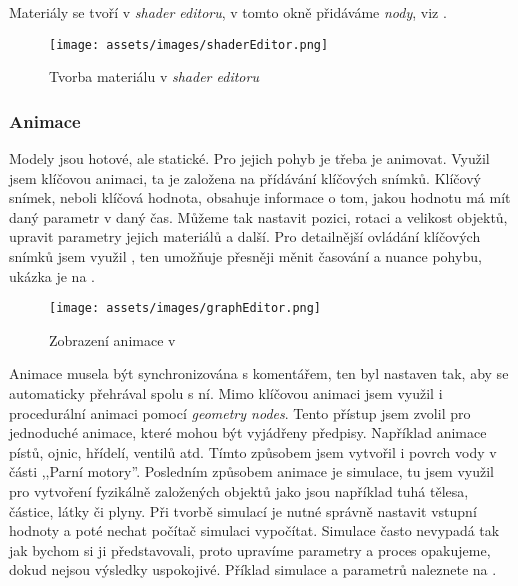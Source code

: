 {Materiály se tvoří v \textit{shader editoru}, v tomto okně přidáváme \textit{nody}, viz .}

\begin{figure}[H]
    \centering
    \texttt{[image: assets/images/shaderEditor.png]}
    \caption{Tvorba materiálu v \textit{shader editoru} \jaObr}
    \label{obr:shaderEditor}
\end{figure}

\newpage

\subsubsection{Animace}
{Modely jsou hotové, ale statické. Pro jejich pohyb je třeba je animovat. Využil jsem klíčovou animaci, ta je založena na přídávání klíčových snímků. Klíčový snímek, neboli klíčová hodnota, obsahuje informace o tom, jakou hodnotu má mít daný parametr v daný čas. Můžeme tak nastavit pozici, rotaci a velikost objektů, upravit parametry jejich materiálů a další.}\odst
{Pro detailnější ovládání klíčových snímků jsem využil , ten umožňuje přesněji měnit časování a nuance pohybu, ukázka  je na .}

\begin{figure}[H]
    \centering
    \texttt{[image: assets/images/graphEditor.png]}
    \caption{Zobrazení animace v  \jaObr}
    \label{obr:grafEditor}
\end{figure}

{Animace musela být synchronizována s komentářem, ten byl nastaven tak, aby se automaticky přehrával spolu s ní. Mimo klíčovou animaci jsem využil i procedurální animaci pomocí \textit{geometry nodes}. Tento přístup jsem zvolil pro jednoduché animace, které mohou být vyjádřeny předpisy. Například animace pístů, ojnic, hřídelí, ventilů atd. Tímto způsobem jsem vytvořil i povrch vody v části ,,Parní motory''.}\odst
{Posledním způsobem animace je simulace, tu jsem využil pro vytvoření fyzikálně založených objektů jako jsou například tuhá tělesa, částice, látky či plyny. Při tvorbě simulací je nutné správně nastavit vstupní hodnoty a poté nechat počítač simulaci vypočítat. Simulace často nevypadá tak jak bychom si ji představovali, proto upravíme parametry a proces opakujeme, dokud nejsou výsledky uspokojivé. Příklad simulace a parametrů naleznete na .}


